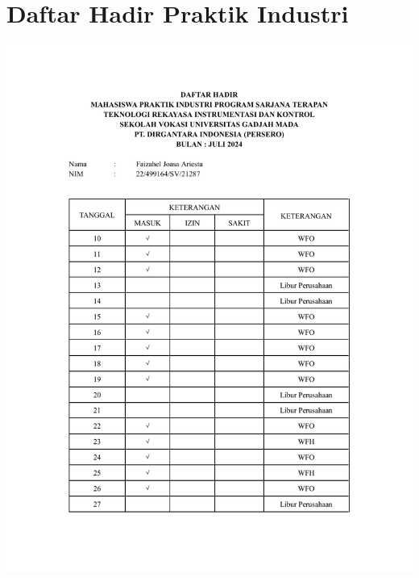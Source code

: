 \section{Daftar Hadir Praktik Industri}
\includegraphics[scale=0.7,page=1]{dokumen/daftarhadir.pdf}
\newpage

